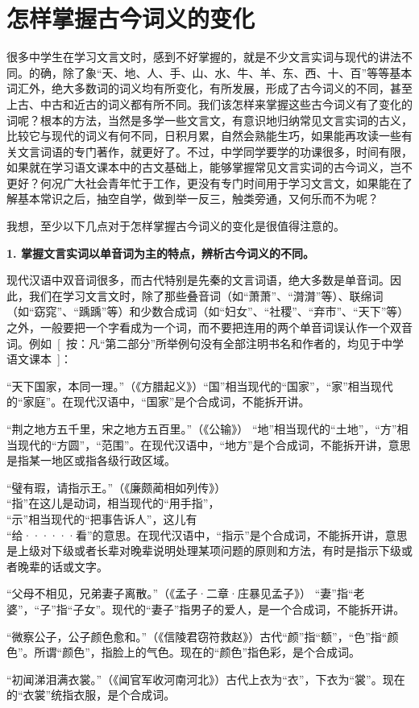 \section{怎样掌握古今词义的变化}

很多中学生在学习文言文时，感到不好掌握的，就是不少文言实词与现代的讲法不同。的确，除了象“天、地、人、手、山、水、牛、羊、东、西、十、百”等等基本词汇外，绝大多数词的词义均有所变化，有所发展，形成了古今词义的不同，甚至上古、中古和近古的词义都有所不同。我们该怎样来掌握这些古今词义有了变化的词呢？根本的方法，当然是多学一些文言文，有意识地归纳常见文言实词的古义，比较它与现代的词义有何不同，日积月累，自然会熟能生巧，如果能再攻读一些有关文言词语的专门著作，就更好了。不过，中学同学要学的功课很多，时间有限，如果就在学习语文课本中的古文基础上，能够掌握常见文言实词的古今词义，岂不更好？何况广大社会青年忙于工作，更没有专门时间用于学习文言文，如果能在了解基本常识之后，抽空自学，做到举一反三，触类旁通，又何乐而不为呢？

我想，至少以下几点对于怎样掌握古今词义的变化是很值得注意的。

\textbf{1. 掌握文言实词以单音词为主的特点，辨析古今词义的不同。}

现代汉语中双音词很多，而古代特别是先秦的文言词语，绝大多数是单音词。因此，我们在学习文言文时，除了那些叠音词（如“萧萧”、“潸潸”等）、联绵词（如“窈窕”、“踽踽”等）和少数合成词（如“妇女”、“社稷”、“弃市”、“天下”等）之外，一般要把一个字看成为一个词，而不要把连用的两个单音词误认作一个双音词。例如\ [\ 按：凡“第二部分”所举例句没有全部注明书名和作者的，均见于中学语文课本\ ]：
\begin{entry}
\item[国家：]“天下国家，本同一理。”（《方腊起义》）“国”相当现代的“国家”，“家”相当现代的“家庭”。在现代汉语中，“国家”是个合成词，不能拆开讲。

\item[地方：]“荆之地方五千里，宋之地方五百里。”（《公输》） “地”相当现代的“土地”，“方”相当现代的“方圆”，“范围”。在现代汉语中，“地方”是个合成词，不能拆开讲，意思是指某一地区或指各级行政区域。

\item[指示：]“璧有瑕，请指示王。”（《廉颇蔺相如列传》）\\
 “指”在这儿是动词，相当现代的“用手指”，\\
 “示”相当现代的“把事告诉人”，这儿有\\
 “给······看”的意思。在现代汉语中，“指示”是个合成词，不能拆开讲，意思是上级对下级或者长辈对晚辈说明处理某项问题的原则和方法，有时是指示下级或者晚辈的话或文字。

\item[妻子：]“父母不相见，兄弟妻子离散。”（《孟子·二章·庄暴见孟子》） “妻”指“老婆”，“子”指“子女”。现代的“妻子”指男子的爱人，是一个合成词，不能拆开讲。

\item[颜色：]“微察公子，公子颜色愈和。”（《信陵君窃符救赵》）古代“颜”指“额”，“色”指“颜色”。所谓“颜色”，指脸上的气色。现在的“颜色”指色彩，是个合成词。

\item[衣裳：]“初闻涕泪满衣裳。”（《闻官军收河南河北》）古代上衣为“衣”，下衣为“裳”。现在的“衣裳”统指衣服，是个合成词。
\end{entry}

